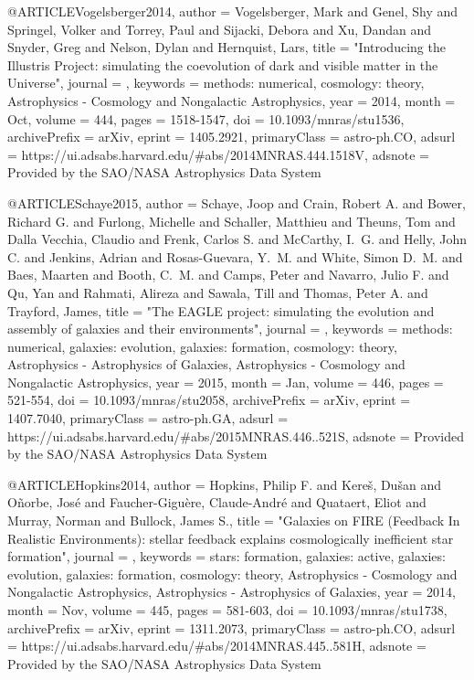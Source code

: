 @ARTICLE{Vogelsberger2014,
       author = {{Vogelsberger}, Mark and {Genel}, Shy and {Springel}, Volker and
        {Torrey}, Paul and {Sijacki}, Debora and {Xu}, Dandan and
        {Snyder}, Greg and {Nelson}, Dylan and {Hernquist}, Lars},
        title = "{Introducing the Illustris Project: simulating the coevolution of dark and visible matter in the Universe}",
      journal = {\mnras},
     keywords = {methods: numerical, cosmology: theory, Astrophysics - Cosmology and Nongalactic Astrophysics},
         year = 2014,
        month = Oct,
       volume = {444},
        pages = {1518-1547},
          doi = {10.1093/mnras/stu1536},
archivePrefix = {arXiv},
       eprint = {1405.2921},
 primaryClass = {astro-ph.CO},
       adsurl = {https://ui.adsabs.harvard.edu/\#abs/2014MNRAS.444.1518V},
      adsnote = {Provided by the SAO/NASA Astrophysics Data System}
}

@ARTICLE{Schaye2015,
       author = {{Schaye}, Joop and {Crain}, Robert A. and {Bower}, Richard G. and
        {Furlong}, Michelle and {Schaller}, Matthieu and {Theuns}, Tom
        and {Dalla Vecchia}, Claudio and {Frenk}, Carlos S. and
        {McCarthy}, I.~G. and {Helly}, John C. and {Jenkins}, Adrian and
        {Rosas-Guevara}, Y.~M. and {White}, Simon D.~M. and {Baes},
        Maarten and {Booth}, C.~M. and {Camps}, Peter and {Navarro},
        Julio F. and {Qu}, Yan and {Rahmati}, Alireza and {Sawala}, Till
        and {Thomas}, Peter A. and {Trayford}, James},
        title = "{The EAGLE project: simulating the evolution and assembly of galaxies and their environments}",
      journal = {\mnras},
     keywords = {methods: numerical, galaxies: evolution, galaxies: formation, cosmology: theory, Astrophysics - Astrophysics of Galaxies, Astrophysics - Cosmology and Nongalactic Astrophysics},
         year = 2015,
        month = Jan,
       volume = {446},
        pages = {521-554},
          doi = {10.1093/mnras/stu2058},
archivePrefix = {arXiv},
       eprint = {1407.7040},
 primaryClass = {astro-ph.GA},
       adsurl = {https://ui.adsabs.harvard.edu/\#abs/2015MNRAS.446..521S},
      adsnote = {Provided by the SAO/NASA Astrophysics Data System}
}

@ARTICLE{Hopkins2014,
       author = {{Hopkins}, Philip F. and {Kere{\v{s}}}, Du{\v{s}}an and {O{\~n}orbe},
        Jos{\'e} and {Faucher-Gigu{\`e}re}, Claude-Andr{\'e} and
        {Quataert}, Eliot and {Murray}, Norman and {Bullock}, James S.},
        title = "{Galaxies on FIRE (Feedback In Realistic Environments): stellar feedback explains cosmologically inefficient star formation}",
      journal = {\mnras},
     keywords = {stars: formation, galaxies: active, galaxies: evolution, galaxies: formation, cosmology: theory, Astrophysics - Cosmology and Nongalactic Astrophysics, Astrophysics - Astrophysics of Galaxies},
         year = 2014,
        month = Nov,
       volume = {445},
        pages = {581-603},
          doi = {10.1093/mnras/stu1738},
archivePrefix = {arXiv},
       eprint = {1311.2073},
 primaryClass = {astro-ph.CO},
       adsurl = {https://ui.adsabs.harvard.edu/\#abs/2014MNRAS.445..581H},
      adsnote = {Provided by the SAO/NASA Astrophysics Data System}
}

